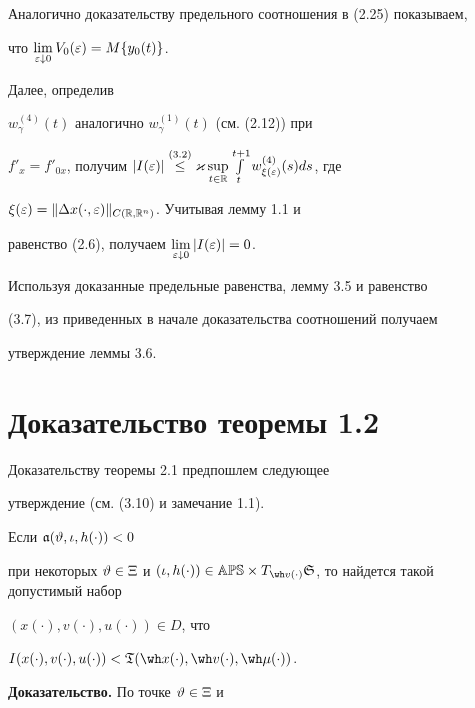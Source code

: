 Аналогично доказательству предельного соотношения в (2.25) показываем,


что $\lim\limits_{\varepsilon\downarrow0}V_0(\varepsilon)=M\{y_0(t)\}$.


Далее, определив


$w_{\gamma}^{(4)}(t)$ аналогично $w_{\gamma}^{(1)}(t)$ (см. (2.12)) при


$f'_{x}=f'_{0x}$, получим $|I(\ve)|\overset{(3.2)}{\le}{}\ak


\sup\lt_{t\in\R}\int\lt_{t}^{t+1}w_{\xi(\ve)}^{(4)}(s)ds$, где


$\xi(\varepsilon)=\|\Delta x(\cdot,\varepsilon)\|_{C(\Bbb R,\Bbb R^{n})}$. Учитывая лемму 1.1 и


равенство (2.6), получаем $\lim\limits_{\varepsilon\downarrow 0}|I(\varepsilon)|=0$.


Используя доказанные предельные равенства, лемму 3.5 и равенство


(3.7), из приведенных в начале доказательства соотношений получаем


утверждение леммы 3.6.





\section{Доказательство теоремы 1.2}





Доказательству теоремы 2.1 предпошлем следующее


утверждение (см. (3.10) и замечание 1.1).





\begin{lems}


Если $\frak a(\vartheta,\iota,h(\cdot))<0$ 


при некоторых $\vt\in\Xi$ и $(\iota,h(\cdot))\in\Bbb{APS}


\times T_{\wh v(\cdot)}\gS$, то найдется такой допустимый набор


$(x(\cdot),v(\cdot),u(\cdot))\in D$, что


$I(x(\cdot),v(\cdot),u(\cdot))<


\gT(\wh x(\cdot),\wh v(\cdot),\wh \mu(\cdot))$.


\end{lems}





{\bf Доказательство.} По точке $\vartheta\in\Xi$ и


